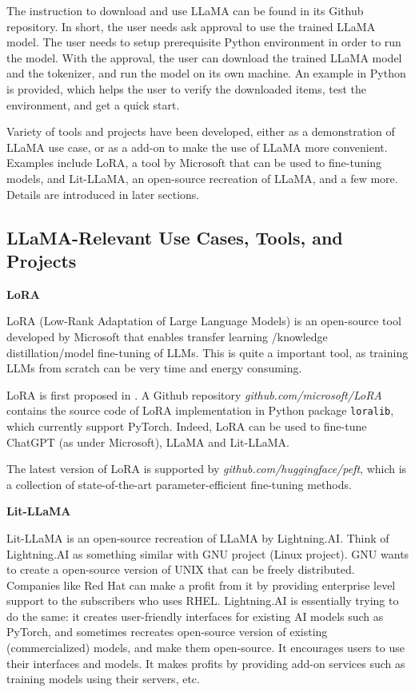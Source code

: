 The instruction to download and use LLaMA can be found in its Github repository. In short, the user needs ask approval to use the trained LLaMA model. The user needs to setup prerequisite Python environment in order to run the model. With the approval, the user can download the trained LLaMA model and the tokenizer, and run the model on its own machine. An example in Python is provided, which helps the user to verify the downloaded items, test the environment, and get a quick start.

Variety of tools and projects have been developed, either as a demonstration of LLaMA use case, or as a add-on to make the use of LLaMA more convenient. Examples include LoRA, a tool by Microsoft that can be used to fine-tuning models, and Lit-LLaMA, an open-source recreation of LLaMA, and a few more. Details are introduced in later sections.

\subsection{LLaMA-Relevant Use Cases, Tools, and Projects}

\vspace{0.1in}
\noindent \textbf{LoRA}
\vspace{0.1in}

LoRA (Low-Rank Adaptation of Large Language Models) is an open-source tool developed by Microsoft that enables transfer learning /knowledge distillation/model fine-tuning of LLMs. This is quite a important tool, as training LLMs from scratch can be very time and energy consuming.

LoRA is first proposed in \cite{hu2021lora}. A Github repository \textit{github.com/microsoft/LoRA} contains the source code of LoRA implementation in Python package \verb|loralib|, which currently support PyTorch. Indeed, LoRA can be used to fine-tune ChatGPT (as under Microsoft), LLaMA and Lit-LLaMA.

The latest version of LoRA is supported by \textit{github.com/huggingface/peft}, which is a collection of state-of-the-art parameter-efficient fine-tuning methods.

\vspace{0.1in}
\noindent \textbf{Lit-LLaMA}
\vspace{0.1in}

Lit-LLaMA is an open-source recreation of LLaMA by Lightning.AI. Think of Lightning.AI as something similar with GNU project (Linux project). GNU wants to create a open-source version of UNIX that can be freely distributed. Companies like Red Hat can make a profit from it by providing enterprise level support to the subscribers who uses RHEL. Lightning.AI is essentially trying to do the same: it creates user-friendly interfaces for existing AI models such as PyTorch, and sometimes recreates open-source version of existing (commercialized) models, and make them open-source. It encourages users to use their interfaces and models. It makes profits by providing add-on services such as training models using their servers, etc.

